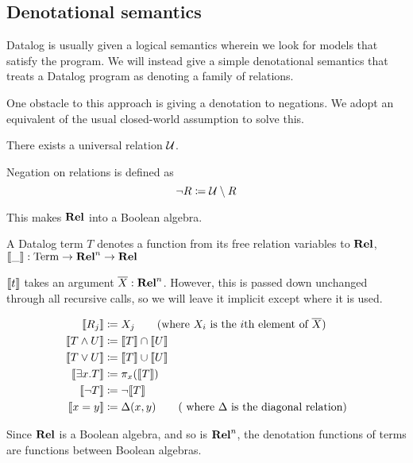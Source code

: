 \subsection{Denotational semantics}

Datalog is usually given a logical semantics wherein we look for models that
satisfy the program. We will instead give a simple denotational semantics that treats a Datalog
program as denoting a family of relations.

One obstacle to this approach is giving a denotation to negations. We adopt an
equivalent of the usual closed-world assumption to solve this.

\begin{defn}
  There exists a universal relation $\mathcal{U}$.

  Negation on relations is defined as
  \begin{displaymath}
    \neg R \coloneqq \mathcal{U} \setminus R
  \end{displaymath}
\end{defn}

This makes $\mathbf{Rel}$ into a Boolean algebra.

\begin{defn}
  A Datalog term $T$ denotes a function from its free relation variables to
  $\mathbf{Rel}$, $\llbracket \_ \rrbracket : \mathrm{Term} \rightarrow \mathbf{Rel}^n \rightarrow \mathbf{Rel}$

  $\llbracket t \rrbracket$ takes an argument $\overline{X} : \mathbf{Rel}^n$. However, this is
  passed down unchanged through all recursive calls, so we will leave it
  implicit except where it is used.

  \begin{align*}
    \denote{R_j} &\defeq X_j \tag{where $X_i$ is the $i$th element of $\overline{X}$}\\
    \denote{T \wedge U} &\defeq \denote{T} \cap \denote{U}\\
    \denote{T \vee U} &\defeq \denote{T} \cup \denote{U}\\
    \denote{\exists x. T} &\defeq \pi_x(\denote{T})\\
    \denote{\neg T} &\defeq \neg \denote{T}\\
    \denote{x=y} &\defeq \Delta(x, y) \tag{ where $\Delta$ is the diagonal relation}
  \end{align*}
\end{defn}

Since $\mathbf{Rel}$ is a Boolean algebra, and so is $\mathbf{Rel}^n$, the denotation
functions of terms are functions between Boolean algebras.

